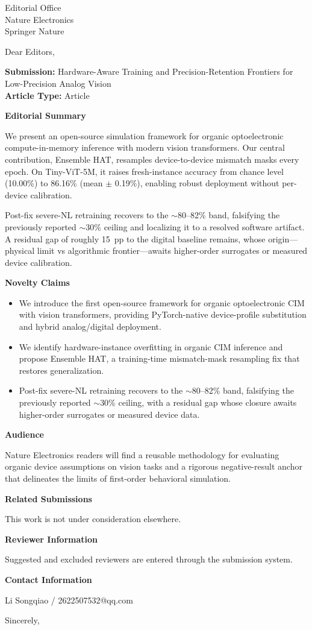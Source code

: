\documentclass[11pt,a4paper]{letter}
\begin{document}
\begin{letter}{Editorial Office\\Nature Electronics\\Springer Nature}

\opening{Dear Editors,}
\vspace{-1em}

\noindent\textbf{Submission:} Hardware-Aware Training and Precision-Retention Frontiers for Low-Precision Analog Vision\\
\textbf{Article Type:} Article

\textbf{Editorial Summary}

We present an open-source simulation framework for organic optoelectronic compute-in-memory inference with modern vision transformers. Our central contribution, Ensemble HAT, resamples device-to-device mismatch masks every epoch. On Tiny-ViT-5M, it raises fresh-instance accuracy from chance level (10.00\%) to 86.16\% (mean $\pm$ 0.19\%), enabling robust deployment without per-device calibration.

Post-fix severe-NL retraining recovers to the $\sim$80--82\% band, falsifying the previously reported $\sim$30\% ceiling and localizing it to a resolved software artifact. A residual gap of roughly 15~pp to the digital baseline remains, whose origin---physical limit vs algorithmic frontier---awaits higher-order surrogates or measured device calibration.

\textbf{Novelty Claims}
\begin{itemize}
    \item We introduce the first open-source framework for organic optoelectronic CIM with vision transformers, providing PyTorch-native device-profile substitution and hybrid analog/digital deployment.
    \item We identify hardware-instance overfitting in organic CIM inference and propose Ensemble HAT, a training-time mismatch-mask resampling fix that restores generalization.
    \item Post-fix severe-NL retraining recovers to the $\sim$80--82\% band, falsifying the previously reported $\sim$30\% ceiling, with a residual gap whose closure awaits higher-order surrogates or measured device data.
\end{itemize}

\textbf{Audience}

Nature Electronics readers will find a reusable methodology for evaluating organic device assumptions on vision tasks and a rigorous negative-result anchor that delineates the limits of first-order behavioral simulation.

\textbf{Related Submissions}

This work is not under consideration elsewhere.

\textbf{Reviewer Information}

Suggested and excluded reviewers are entered through the submission system.

\textbf{Contact Information}

Li Songqiao / 2622507532@qq.com

\closing{Sincerely,}

\end{letter}
\end{document}
